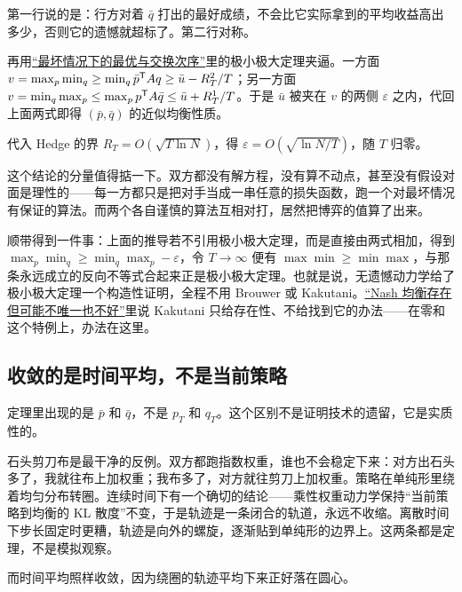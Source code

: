 第一行说的是：行方对着 \(\bar q\) 打出的最好成绩，不会比它实际拿到的平均收益高出多少，否则它的遗憾就超标了。第二行对称。

再用\hyperref[sec:17-Constrained-Guarantees/06-Games-and-Equilibria/01]{``最坏情况下的最优与交换次序''}里的极小极大定理夹逼。一方面 \(v=\max_p\min_q\ge\min_q\bar p^{\mathsf{T}}Aq\ge\bar u-R^2_T/T\)；另一方面 \(v=\min_q\max_p\le\max_p p^{\mathsf{T}}A\bar q\le\bar u+R^1_T/T\)。于是 \(\bar u\) 被夹在 \(v\) 的两侧 \(\varepsilon\) 之内，代回上面两式即得 \((\bar p,\bar q)\) 的近似均衡性质。

代入 Hedge 的界 \(R_T=O(\sqrt{T\ln N})\)，得 \(\varepsilon=O(\sqrt{\ln N/T})\)，随 \(T\) 归零。

这个结论的分量值得掂一下。双方都没有解方程，没有算不动点，甚至没有假设对面是理性的——每一方都只是把对手当成一串任意的损失函数，跑一个对最坏情况有保证的算法。而两个各自谨慎的算法互相对打，居然把博弈的值算了出来。

顺带得到一件事：上面的推导若不引用极小极大定理，而是直接由两式相加，得到 \(\max_p\min_q\ge\min_q\max_p-\varepsilon\)，令 \(T\to\infty\) 便有 \(\max\min\ge\min\max\)，与那条永远成立的反向不等式合起来正是极小极大定理。也就是说，无遗憾动力学给了极小极大定理一个构造性证明，全程不用 Brouwer 或 Kakutani。\hyperref[sec:17-Constrained-Guarantees/06-Games-and-Equilibria/02]{``Nash 均衡存在但可能不唯一也不好''}里说 Kakutani 只给存在性、不给找到它的办法——在零和这个特例上，办法在这里。

\subsection{收敛的是时间平均，不是当前策略}

定理里出现的是 \(\bar p\) 和 \(\bar q\)，不是 \(p_T\) 和 \(q_T\)。这个区别不是证明技术的遗留，它是实质性的。

石头剪刀布是最干净的反例。双方都跑指数权重，谁也不会稳定下来：对方出石头多了，我就往布上加权重；我布多了，对方就往剪刀上加权重。策略在单纯形里绕着均匀分布转圈。连续时间下有一个确切的结论——乘性权重动力学保持``当前策略到均衡的 KL 散度''不变，于是轨迹是一条闭合的轨道，永远不收缩。离散时间下步长固定时更糟，轨迹是向外的螺旋，逐渐贴到单纯形的边界上。这两条都是定理，不是模拟观察。

而时间平均照样收敛，因为绕圈的轨迹平均下来正好落在圆心。

